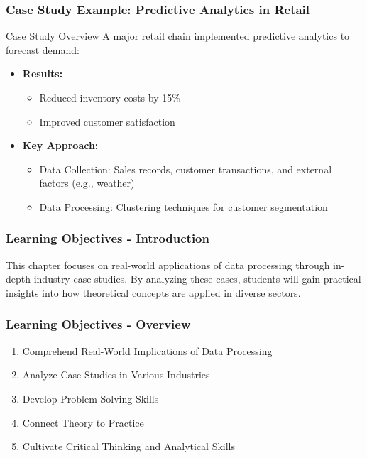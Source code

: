 \documentclass{beamer}
\begin{document}
\begin{frame}[fragile]
    \frametitle{Case Study Example: Predictive Analytics in Retail}
    \begin{block}{Case Study Overview}
        A major retail chain implemented predictive analytics to forecast demand:
    \end{block}
    \begin{itemize}
        \item \textbf{Results:}
            \begin{itemize}
                \item Reduced inventory costs by 15\%
                \item Improved customer satisfaction
            \end{itemize}
        \item \textbf{Key Approach:}
            \begin{itemize}
                \item Data Collection: Sales records, customer transactions, and external factors (e.g., weather)
                \item Data Processing: Clustering techniques for customer segmentation
            \end{itemize}
    \end{itemize}
\end{frame}

\begin{frame}[fragile]
    \frametitle{Learning Objectives - Introduction}
    This chapter focuses on real-world applications of data processing through in-depth industry case studies. By analyzing these cases, students will gain practical insights into how theoretical concepts are applied in diverse sectors.
\end{frame}

\begin{frame}[fragile]
    \frametitle{Learning Objectives - Overview}
    \begin{enumerate}
        \item Comprehend Real-World Implications of Data Processing
        \item Analyze Case Studies in Various Industries
        \item Develop Problem-Solving Skills
        \item Connect Theory to Practice
        \item Cultivate Critical Thinking and Analytical Skills
    \end{enumerate}
\end{frame}
\end{document}
